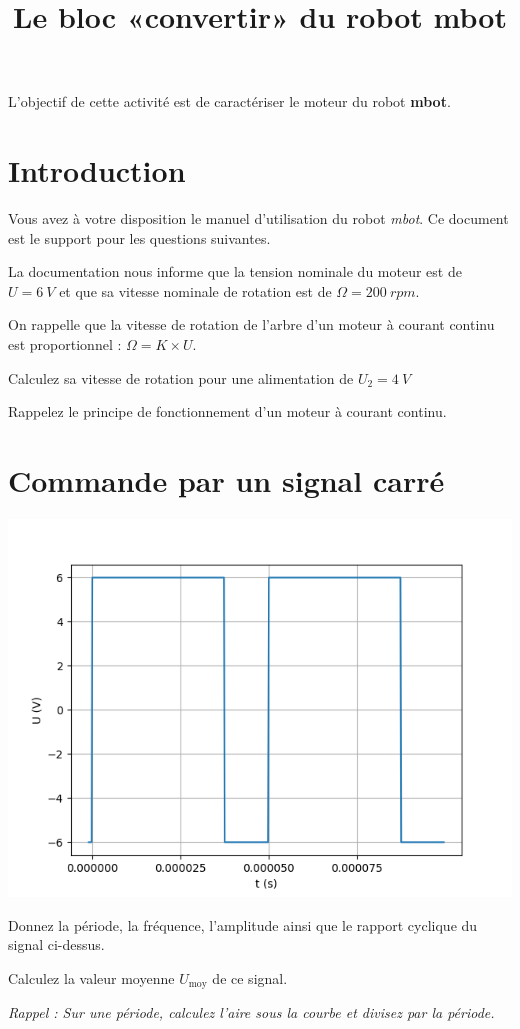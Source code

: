 \documentclass[10pt,fleqn]{article} %
\title{Le bloc «convertir» du robot mbot}
\date{}
\begin{document}
\maketitle
\chapterimage{}
%
\begin{obj}
  L'objectif de cette activité est de caractériser le moteur du robot \textbf{mbot}.
\end{obj}
\section{Introduction}
Vous avez à votre disposition le manuel d'utilisation du robot \textit{mbot}. Ce document est le support pour les questions suivantes.

La documentation nous informe que la tension nominale du moteur est de $U=\SI{6}{V}$ et que sa vitesse nominale de rotation est de $\Omega=\SI{200}{rpm}$.

On rappelle que la vitesse de rotation de l'arbre d'un moteur à courant continu est proportionnel : $\Omega = K\times U$.
\begin{question}
   Calculez sa vitesse de rotation pour une alimentation de $U_2=\SI{4}{V}$
\end{question}
\begin{question}
  Rappelez le principe de fonctionnement d'un moteur à courant continu.
\end{question}
\section{Commande par un signal carré}
\begin{center}
  \includegraphics[width=.6\textwidth]{images/carre75}
\end{center}

\begin{question}
  Donnez la période, la fréquence, l'amplitude ainsi que le rapport cyclique du signal ci-dessus.
\end{question}
      \pagebreak
\begin{question}
  Calculez la valeur moyenne $U_\text{moy}$ de ce signal.

  \textit{Rappel : Sur une période, calculez l'aire sous la courbe et divisez par la période.}

\end{question}
\end{document}
